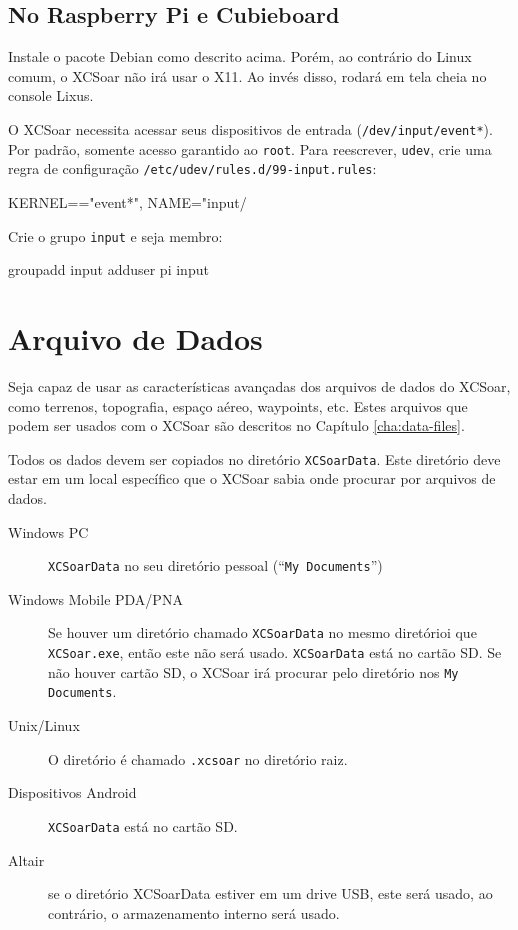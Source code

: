 \subsection*{No Raspberry Pi e Cubieboard}

Instale o pacote Debian como descrito acima.  Porém, ao contrário do Linux comum, o XCSoar não irá usar o X11.  Ao invés disso, rodará em tela cheia no console Lixus.

O XCSoar necessita acessar seus dispositivos de entrada
(\texttt{/dev/input/event*}).  Por padrão, somente acesso garantido ao \texttt{root}.  Para reescrever,  \texttt{udev}, crie uma regra de configuração \texttt{/etc/udev/rules.d/99-input.rules}:

\begin{verbatim*}
KERNEL=="event*", NAME="input/%k", MODE="660", GROUP="input"
\end{verbatim*}

Crie o grupo \texttt{input} e seja membro:

\begin{verbatim*}
groupadd input
adduser pi input
\end{verbatim*}

\section{Arquivo de Dados}\label{sec:data files}

Seja capaz de usar as características avançadas dos arquivos de dados do XCSoar, como terrenos, topografia, espaço aéreo, waypoints, etc.  
Estes arquivos que podem ser usados com o XCSoar são descritos no Capítulo
\ref{cha:data-files}.

Todos os dados devem ser copiados no diretório 
\texttt{XCSoarData}.  Este diretório deve estar em um local específico que o XCSoar sabia onde procurar por arquivos de dados.

\begin{description}
\item[Windows PC]
\texttt{XCSoarData} no seu diretório pessoal (``\texttt{My
Documents}'')
\item[Windows Mobile PDA/PNA]
Se houver um diretório chamado \texttt{XCSoarData} no mesmo diretórioi que \texttt{XCSoar.exe}, então este não será usado.
\texttt{XCSoarData} está no cartão SD.  Se não houver cartão SD, o XCSoar irá procurar pelo diretório nos \texttt{My Documents}.
\item[Unix/Linux]
O diretório é chamado \verb|.xcsoar| no diretório raiz.
\item[Dispositivos Android]
\texttt{XCSoarData} está no cartão SD.
\item[Altair]
se o diretório XCSoarData estiver em um drive USB, este será usado, ao contrário, o armazenamento interno será usado.
\end{description}


